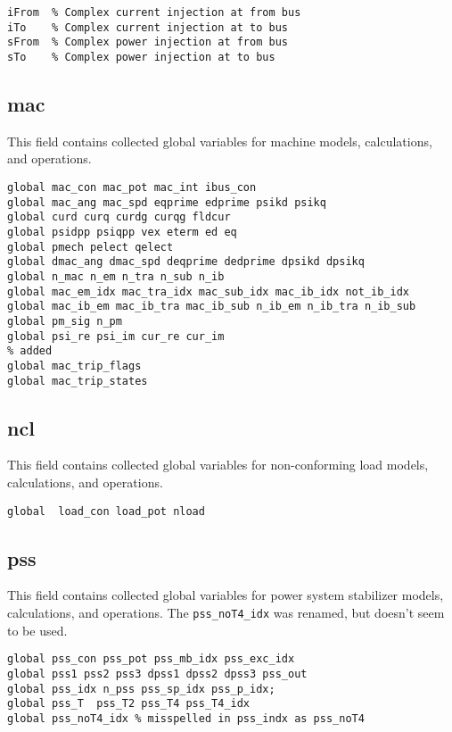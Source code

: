 \begin{verbatim}
iFrom  % Complex current injection at from bus
iTo    % Complex current injection at to bus
sFrom  % Complex power injection at from bus
sTo    % Complex power injection at to bus
\end{verbatim}

\subsection{mac}
This field contains collected global variables for machine models, calculations, and operations.
\begin{verbatim}
global mac_con mac_pot mac_int ibus_con
global mac_ang mac_spd eqprime edprime psikd psikq
global curd curq curdg curqg fldcur
global psidpp psiqpp vex eterm ed eq
global pmech pelect qelect
global dmac_ang dmac_spd deqprime dedprime dpsikd dpsikq
global n_mac n_em n_tra n_sub n_ib
global mac_em_idx mac_tra_idx mac_sub_idx mac_ib_idx not_ib_idx
global mac_ib_em mac_ib_tra mac_ib_sub n_ib_em n_ib_tra n_ib_sub
global pm_sig n_pm 
global psi_re psi_im cur_re cur_im
% added
global mac_trip_flags
global mac_trip_states
\end{verbatim}

\subsection{ncl}
This field contains collected global variables for non-conforming load models, calculations, and operations.
\begin{verbatim}
global  load_con load_pot nload
\end{verbatim}

\subsection{pss}
This field contains collected global variables for power system stabilizer models, calculations, and operations.
The \verb|pss_noT4_idx| was renamed, but doesn't seem to be used.
\begin{verbatim}
global pss_con pss_pot pss_mb_idx pss_exc_idx
global pss1 pss2 pss3 dpss1 dpss2 dpss3 pss_out
global pss_idx n_pss pss_sp_idx pss_p_idx;
global pss_T  pss_T2 pss_T4 pss_T4_idx  
global pss_noT4_idx % misspelled in pss_indx as pss_noT4
\end{verbatim}



